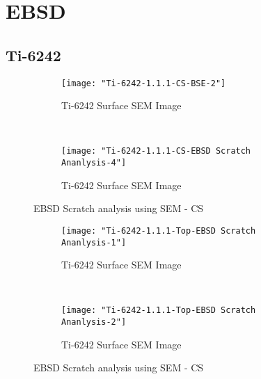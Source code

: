 \newpage
\renewcommand{\workingDate}{\textsc{2017 $|$ September $|$ 22}}
\section{EBSD}
\subsection{Ti-6242}

\begin{figure}[H]
    \centering
    \begin{subfigure}{0.49\textwidth}
        \texttt{[image: "Ti-6242-1.1.1-CS-BSE-2"]}
        \caption{Ti-6242 Surface SEM Image}
        \label{fig:Ti-6242 Williamson-Hall Plot}
    \end{subfigure}
    ~
    \begin{subfigure}{0.49\textwidth}
        \texttt{[image: "Ti-6242-1.1.1-CS-EBSD Scratch Ananlysis-4"]}
        \caption{Ti-6242 Surface SEM Image}
        \label{fig:Ti-6242 Williamson-Hall Plot}
    \end{subfigure}
  
    \caption{EBSD Scratch analysis using SEM - CS}
    \label{fig:EBSD Scratch analysis using SEM - CS}
\end{figure}

\begin{figure}[H]
    \centering
    \begin{subfigure}{0.49\textwidth}
        \texttt{[image: "Ti-6242-1.1.1-Top-EBSD Scratch Ananlysis-1"]}
        \caption{Ti-6242 Surface SEM Image}
        \label{fig:Ti-6242 Williamson-Hall Plot}
    \end{subfigure}
    ~
    \begin{subfigure}{0.49\textwidth}
        \texttt{[image: "Ti-6242-1.1.1-Top-EBSD Scratch Ananlysis-2"]}
        \caption{Ti-6242 Surface SEM Image}
        \label{fig:Ti-6242 Williamson-Hall Plot}
    \end{subfigure}
  
    \caption{EBSD Scratch analysis using SEM - CS}
    \label{fig:EBSD Scratch analysis using SEM - Top}
\end{figure}